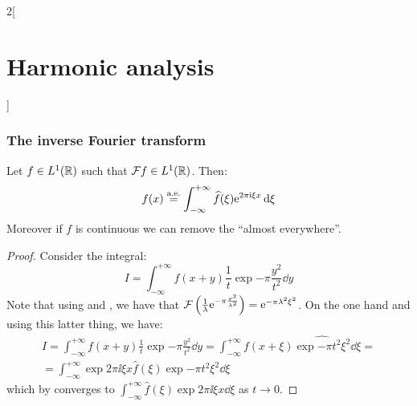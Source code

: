 \documentclass[../../../main_math.tex]{subfiles}
\begin{document}
\begin{multicols}{2}[\section{Harmonic analysis}]
  \subsubsection{The inverse Fourier transform}
  \begin{theorem}\label{HA:inverseFT}
    Let $f\in L^1(\mathbb{R})$ such that $\mathcal{F} f\in L^1(\mathbb{R})$. Then:
    $$f(x)\overset{\text{a.e.}}{=}\int_{-\infty}^{+\infty}\widehat{f}(\xi)\mathrm{e}^{2\pi \mathrm{i} \xi x}\dd{\xi}$$
    Moreover if $f$ is continuous we can remove the ``almost everywhere''.
  \end{theorem}
  \begin{proof}
    Consider the integral: $$I=\int_{-\infty}^{+\infty}f(x+y)\frac{1}{t}\exp{-\pi \frac{y^2}{t^2}}\dd{y}$$
    Note that using  and , we have that $\mathcal{F} \left(\frac{1}{\lambda}\mathrm{e}^{-\pi \frac{x^2}{\lambda^2}}\right)=\mathrm{e}^{-\pi\lambda^2\xi^2}$. On the one hand and using this latter thing,  we have:
    \begin{multline*}
      I=\int_{-\infty}^{+\infty}f(x+y)\frac{1}{t}\exp{-\pi \frac{y^2}{t^2}}\dd{y}=\int_{-\infty}^{+\infty}f(x+\xi)\widehat{\exp{-\pi t^2\xi^2}}\dd{\xi}=\\
      =\int_{-\infty}^{+\infty}\exp{2\pi\ii\xi x}\widehat{f}(\xi)\exp{-\pi t^2\xi^2}\dd{\xi}
    \end{multline*}
    which by  converges to $\int_{-\infty}^{+\infty}\widehat{f}(\xi)\exp{2\pi \ii \xi x}\dd{\xi}$ as $t\to 0$.


\end{proof}
\end{multicols}
\end{document}
